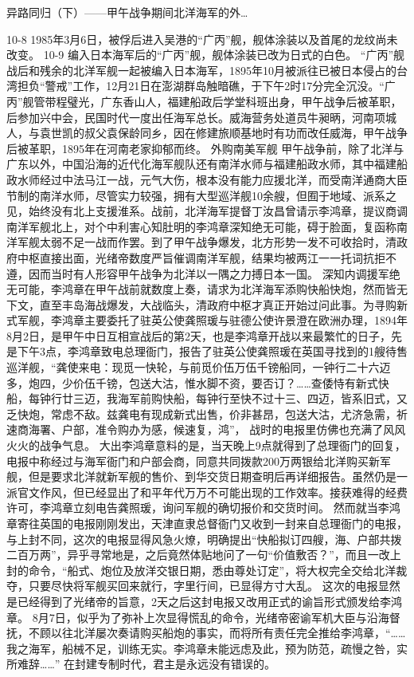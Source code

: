 \documentclass[12pt,UTF8]{ctexbook}
\begin{document}
异路同归（下）——甲午战争期间北洋海军的外…

10-8
1985年3月6日，被俘后进入吴港的“广丙”舰，舰体涂装以及首尾的龙纹尚未改变。
10-9
编入日本海军后的“广丙”舰，舰体涂装已改为日式的白色。
“广丙”舰战后和残余的北洋军舰一起被编入日本海军，1895年10月被派往已被日本侵占的台湾担负“警戒”工作，12月21日在澎湖群岛触暗礁，于下午2时17分完全沉没。“广丙”舰管带程璧光，广东香山人，福建船政后学堂科班出身，甲午战争后被革职，后参加兴中会，民国时代一度出任海军总长。威海营务处道员牛昶昞，河南项城人，与袁世凯的叔父袁保龄同乡，因在修建旅顺基地时有功而改任威海，甲午战争后被革职，1895年在河南老家抑郁而终。
外购南美军舰
甲午战争前，除了北洋与广东以外，中国沿海的近代化海军舰队还有南洋水师与福建船政水师，其中福建船政水师经过中法马江一战，元气大伤，根本没有能力应援北洋，而受南洋通商大臣节制的南洋水师，尽管实力较强，拥有大型巡洋舰10余艘，但囿于地域、派系之见，始终没有北上支援淮系。战前，北洋海军提督丁汝昌曾请示李鸿章，提议商调南洋军舰北上，对个中利害心知肚明的李鸿章深知绝无可能，碍于脸面，复函称南洋军舰太弱不足一战而作罢。到了甲午战争爆发，北方形势一发不可收拾时，清政府中枢直接出面，光绪帝数度严旨催调南洋军舰，结果均被两江一一托词抗拒不遵，因而当时有人形容甲午战争为北洋以一隅之力搏日本一国。
深知内调援军绝无可能，李鸿章在甲午战前就数度上奏，请求为北洋海军添购快船快炮，然而皆无下文，直至丰岛海战爆发，大战临头，清政府中枢才真正开始过问此事。为寻购新式军舰，李鸿章主要委托了驻英公使龚照瑗与驻德公使许景澄在欧洲办理，1894年8月2日，是甲午中日互相宣战后的第2天，也是李鸿章开战以来最繁忙的日子，先是下午3点，李鸿章致电总理衙门，报告了驻英公使龚照瑗在英国寻找到的1艘待售巡洋舰，“龚使来电：现觅一快轮，与前觅价伍万伍千镑船同，一钟行二十六迈多，炮四，少价伍千镑，包送大沽，惟水脚不资，要否订？……查倭恃有新式快船，每钟行廿三迈，我海军前购快船，每钟行至快不过十三、四迈，皆系旧式，又乏快炮，常虑不敌。兹龚电有现成新式出售，价非甚昂，包送大沽，尤济急需，祈速商海署、户部，准令购办为感，候速复，鸿”， 战时的电报里仿佛也充满了风风火火的战争气息。
大出李鸿章意料的是，当天晚上9点就得到了总理衙门的回复，电报中称经过与海军衙门和户部会商，同意共同拨款200万两银给北洋购买新军舰，但是要求北洋就新军舰的售价、到华交货日期查明后再详细报告。虽然仍是一派官文作风，但已经显出了和平年代万万不可能出现的工作效率。接获难得的经费许可，李鸿章立刻电告龚照瑗，询问军舰的确切报价和交货时间。
然而就当李鸿章寄往英国的电报刚刚发出，天津直隶总督衙门又收到一封来自总理衙门的电报，与上封不同，这次的电报显得风急火燎，明确提出“快船拟订四艘，海、户部共拨二百万两”，异乎寻常地是，之后竟然体贴地问了一句“价值敷否？”，而且一改上封的命令，“船式、炮位及放洋交银日期，悉由尊处订定”，将大权完全交给北洋裁夺，只要尽快将军舰买回来就行，字里行间，已显得方寸大乱。 这次的电报显然是已经得到了光绪帝的旨意，2天之后这封电报又改用正式的谕旨形式颁发给李鸿章。 8月7日，似乎为了弥补上次显得慌乱的命令，光绪帝密谕军机大臣与沿海督抚，不顾以往北洋屡次奏请购买船炮的事实，而将所有责任完全推给李鸿章，“……我之海军，船械不足，训练无实。李鸿章未能远虑及此，预为防范，疏慢之咎，实所难辞……” 在封建专制时代，君主是永远没有错误的。
\end{document}
